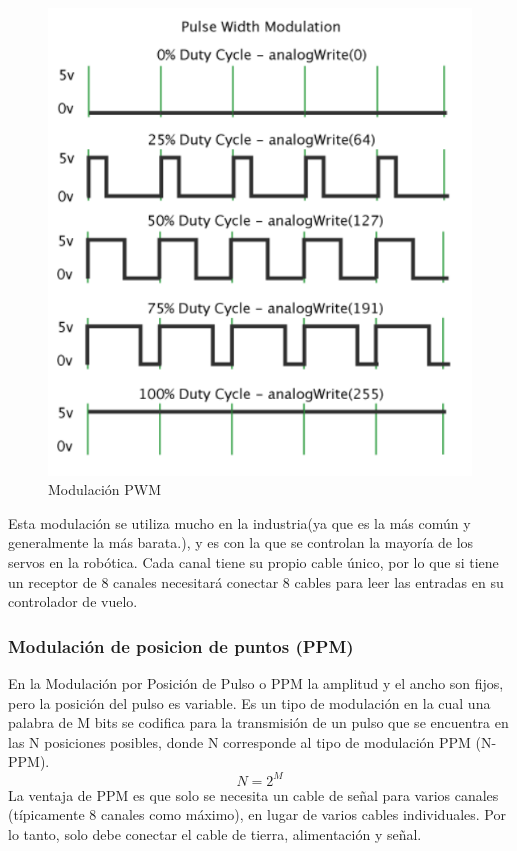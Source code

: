 \begin{figure}[H]
	\center
	\includegraphics[scale=0.7]{imagenes/EstadodelArte/pwm.png}
	\caption{Modulación PWM}
	\label{fig:PWM}
\end{figure}

Esta modulación se utiliza mucho en la industria(ya que es la más común y generalmente la más barata.), y es con la que se controlan la mayoría de los servos en la robótica. 
Cada canal tiene su propio cable único, por lo que si tiene un receptor de 8 canales necesitará conectar 8 cables para leer las entradas en su controlador de vuelo.

\subsubsection{Modulación de posicion de puntos (PPM)}
En la Modulación por Posición de Pulso o PPM la amplitud y el ancho son fijos, pero la posición del pulso es variable. Es un tipo de modulación en la cual una palabra de M bits se codifica para la transmisión de un pulso que se encuentra en las N posiciones posibles,  donde N corresponde al tipo de modulación PPM (N-PPM).
\begin{equation} 
N=2^M 
\end{equation} 
La ventaja de PPM es que solo se necesita un cable de señal para varios canales (típicamente 8 canales como máximo), en lugar de varios cables individuales. Por lo tanto, solo debe conectar el cable de tierra, alimentación y señal.

